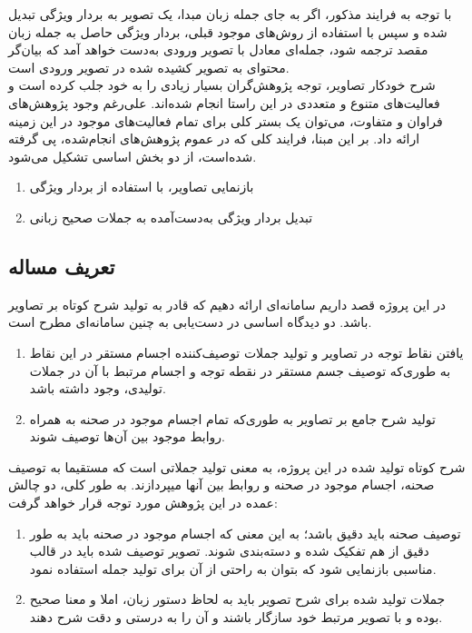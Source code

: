 با توجه به فرایند مذکور، اگر به جای جمله زبان مبدا، یک تصویر به بردار ویژگی تبدیل شده و سپس با استفاده از روش‌های موجود قبلی، بردار ویژگی حاصل به جمله زبان مقصد ترجمه شود، جمله‌ای معادل با تصویر ورودی به‌دست خواهد آمد  که بیان‌گر محتوای به تصویر کشیده شده در تصویر ورودی است.
\\
شرح خودکار تصاویر، توجه پژوهش‌گران بسیار زیادی را به خود جلب کرده است و فعالیت‌های متنوع و متعددی در این راستا انجام شده‌اند. علی‌رغم وجود پژوهش‌‌های فراوان و متفاوت، می‌توان یک بستر کلی برای تمام فعالیت‌های موجود در این زمینه ارائه داد. بر این مبنا، فرایند کلی که در عموم پژوهش‌های انجام‌شده، پی گرفته شده‌است، از دو بخش اساسی تشکیل می‌شود.
\begin{enumerate}
\item بازنمایی تصاویر، با استفاده از بردار ویژگی
\item تبدیل بردار ويژگی به‌دست‌آمده به جملات صحیح زبانی
\end{enumerate}


\subsection{تعریف مساله}
در این پروژه قصد داریم سامانه‌ای ارائه دهیم که قادر به تولید شرح کوتاه بر تصاویر باشد. دو دیدگاه اساسی در دست‌یابی به چنین سامانه‌ای مطرح است.
\begin{enumerate}
\item
 یافتن نقاط توجه 
در تصاویر و تولید جملات توصیف‌کننده اجسام مستقر در این نقاط به طوری‌که توصیف جسم مستقر در نقطه توجه و اجسام مرتبط با آن در جملات تولیدی، وجود داشته باشد.
\item  تولید شرح جامع بر تصاویر به طوری‌که تمام اجسام موجود در صحنه به همراه روابط موجود بین آن‌ها توصیف شوند. 
\end{enumerate}

شرح کوتاه تولید شده در این پروژه، به معنی تولید جملاتی است که مستقیما به توصیف صحنه، اجسام موجود در صحنه و روابط بین آن­ها می­پردازند.
به طور کلی، دو چالش عمده در این پژوهش مورد توجه قرار خواهد گرفت:
\begin{enumerate}
\item  توصیف صحنه باید دقیق باشد؛ به این معنی که اجسام موجود در صحنه باید به طور دقیق از هم تفکیک شده و دسته‌بندی شوند. تصویر توصیف شده باید در قالب مناسبی بازنمایی شود که بتوان به راحتی از آن برای تولید جمله استفاده نمود.
\item  جملات تولید شده برای شرح تصویر باید به لحاظ دستور زبان، املا و معنا صحیح بوده و با تصویر مرتبط خود سازگار باشند و آن را به درستی و دقت شرح دهند.
\end{enumerate}


